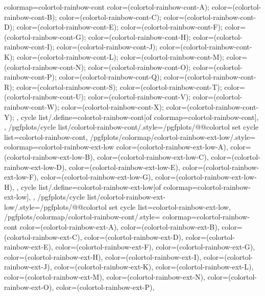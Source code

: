 {{    colormap={colortol-rainbow-cont}{
      color=(colortol-rainbow-cont-A);
      color=(colortol-rainbow-cont-B);
      color=(colortol-rainbow-cont-C);
      color=(colortol-rainbow-cont-D);
      color=(colortol-rainbow-cont-E);
      color=(colortol-rainbow-cont-F);
      color=(colortol-rainbow-cont-G);
      color=(colortol-rainbow-cont-H);
      color=(colortol-rainbow-cont-I);
      color=(colortol-rainbow-cont-J);
      color=(colortol-rainbow-cont-K);
      color=(colortol-rainbow-cont-L);
      color=(colortol-rainbow-cont-M);
      color=(colortol-rainbow-cont-N);
      color=(colortol-rainbow-cont-O);
      color=(colortol-rainbow-cont-P);
      color=(colortol-rainbow-cont-Q);
      color=(colortol-rainbow-cont-R);
      color=(colortol-rainbow-cont-S);
      color=(colortol-rainbow-cont-T);
      color=(colortol-rainbow-cont-U);
      color=(colortol-rainbow-cont-V);
      color=(colortol-rainbow-cont-W);
      color=(colortol-rainbow-cont-X);
      color=(colortol-rainbow-cont-Y);
    },
    cycle list/.define={colortol-rainbow-cont}{[of colormap=colortol-rainbow-cont]},
  },
  /pgfplots/cycle list/colortol-rainbow-cont/.style={/pgfplots/@@colortol set cycle list={colortol-rainbow-cont}},
  /pgfplots/colormap/colortol-rainbow-ext-low/.style={
    colormap={colortol-rainbow-ext-low}{
      color=(colortol-rainbow-ext-low-A),
      color=(colortol-rainbow-ext-low-B),
      color=(colortol-rainbow-ext-low-C),
      color=(colortol-rainbow-ext-low-D),
      color=(colortol-rainbow-ext-low-E),
      color=(colortol-rainbow-ext-low-F),
      color=(colortol-rainbow-ext-low-G),
      color=(colortol-rainbow-ext-low-H),
    },
    cycle list/.define={colortol-rainbow-ext-low}{[of colormap=colortol-rainbow-ext-low]},
  },
  /pgfplots/cycle list/colortol-rainbow-ext-low/.style={/pgfplots/@@colortol set cycle list={colortol-rainbow-ext-low}},
  /pgfplots/colormap/colortol-rainbow-cont/.style={
    colormap={colortol-rainbow-cont}{
      color=(colortol-rainbow-ext-A),
      color=(colortol-rainbow-ext-B),
      color=(colortol-rainbow-ext-C),
      color=(colortol-rainbow-ext-D),
      color=(colortol-rainbow-ext-E),
      color=(colortol-rainbow-ext-F),
      color=(colortol-rainbow-ext-G),
      color=(colortol-rainbow-ext-H),
      color=(colortol-rainbow-ext-I),
      color=(colortol-rainbow-ext-J),
      color=(colortol-rainbow-ext-K),
      color=(colortol-rainbow-ext-L),
      color=(colortol-rainbow-ext-M),
      color=(colortol-rainbow-ext-N),
      color=(colortol-rainbow-ext-O),
      color=(colortol-rainbow-ext-P),
}}}
